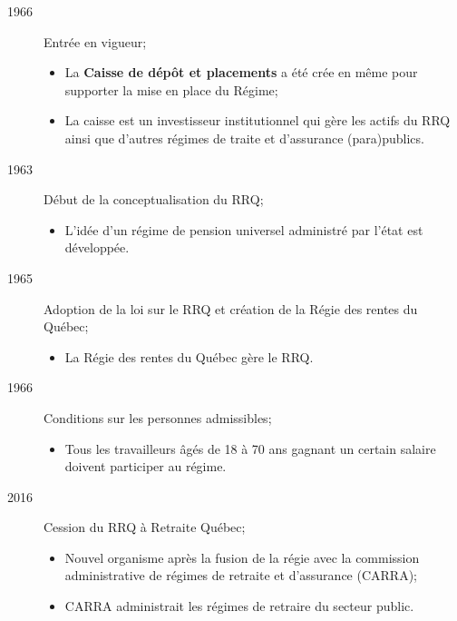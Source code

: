 \documentclass[10pt, french]{article}
\begin{document}
\begin{multicols*}{3}
\begin{rappel_enhanced}
\begin{description}
	\item[1966]	Entrée en vigueur;
		\begin{itemize}[leftmargin = *]
		\item	La \textbf{Caisse de dépôt et placements} a été crée en même pour supporter la mise en place du Régime;
		\item	La caisse est un investisseur institutionnel qui gère les actifs du RRQ ainsi que d'autres régimes de traite et d'assurance (para)publics.
		\end{itemize}
	\item[1963]	Début de la conceptualisation du RRQ;
		\begin{itemize}[leftmargin = *]
		\item	L'idée d'un régime de pension universel administré par l'état est développée.
		\end{itemize}
	\item[1965]	Adoption de la loi sur le RRQ et création de la Régie des rentes du Québec;
		\begin{itemize}[leftmargin = *]
		\item	La Régie des rentes du Québec gère le RRQ.
		\end{itemize}
	\item[1966]	Conditions sur les personnes admissibles;
		\begin{itemize}[leftmargin = *]
		\item	Tous les travailleurs âgés de 18 à 70 ans gagnant un certain salaire doivent participer au régime.
		\end{itemize}
	\item[2016]	Cession du RRQ à Retraite Québec;
		\begin{itemize}[leftmargin = *]
		\item	Nouvel organisme après la fusion de la régie avec la commission administrative de régimes de retraite et d'assurance (CARRA);
		\item	CARRA administrait les régimes de retraire du secteur public.
		\end{itemize}
\end{description}
\end{rappel_enhanced}


\end{multicols*}
\end{document}
